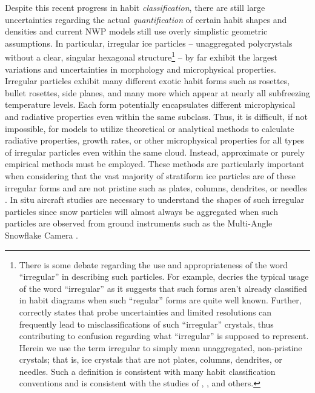 \documentclass[amt, manuscript]{copernicus}
\begin{document}
Despite this recent progress in habit \textit{classification}, there are still large uncertainties regarding the actual \textit{quantification} of certain habit shapes and densities and current NWP models still use overly simplistic geometric assumptions. In particular, irregular ice particles -- unaggregated polycrystals without a clear, singular hexagonal structure\footnote{There is some debate regarding the use and appropriateness of the word ``irregular'' in describing such particles. For example, \citet{Stoelinga2007} decries the typical usage of the word ``irregular'' as it suggests that such forms aren't already classified in habit diagrams when such ``regular'' forms are quite well known. Further, \citet{Stoelinga2007} correctly states that probe uncertainties and limited resolutions can frequently lead to misclassifications of such ``irregular'' crystals, thus contributing to confusion regarding what ``irregular'' is supposed to represent. Herein we use the term irregular to simply mean unaggregated, non-pristine crystals; that is, ice crystals that are not plates, columns, dendrites, or needles. Such a definition is consistent with many habit classification conventions and is consistent with the studies of \citet{Korolev2000}, \citet{Korolev2003}, and others.} -- by far exhibit the largest variations and uncertainties in morphology and microphysical properties. Irregular particles exhibit many different exotic habit forms such as rosettes, bullet rosettes, side planes, and many more \citep{Bailey2009} which appear at nearly all subfreezing temperature levels. Each form potentially encapsulates different microphysical and radiative properties even within the same subclass. Thus, it is difficult, if not impossible, for models to utilize theoretical or analytical methods to calculate radiative properties, growth rates, or other microphysical properties for all types of irregular particles even within the same cloud. Instead, approximate or purely empirical methods must be employed. These methods are particularly important when considering that the vast majority of stratiform ice particles are of these irregular forms and are not pristine such as plates, columns, dendrites, or needles \citep{Korolev1999,Korolev2000,Korolev2003}.
In situ aircraft studies are necessary to understand the shapes of such irregular particles since snow particles will almost always be aggregated when such particles are observed from ground instruments such as the Multi-Angle Snowflake Camera \citep[MASC;][]{Garrett2015}.

\end{document}
